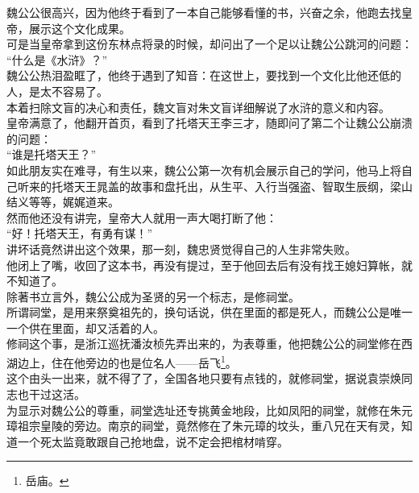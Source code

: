 \begin{multicols}{\theparacolNo}
魏公公很高兴，因为他终于看到了一本自己能够看懂的书，兴奋之余，他跑去找皇帝，展示这个文化成果。\\

可是当皇帝拿到这份东林点将录的时候，却问出了一个足以让魏公公跳河的问题：\\

“什么是《水浒》？”\\

魏公公热泪盈眶了，他终于遇到了知音：在这世上，要找到一个文化比他还低的人，是太不容易了。\\

本着扫除文盲的决心和责任，魏文盲对朱文盲详细解说了水浒的意义和内容。\\

皇帝满意了，他翻开首页，看到了托塔天王李三才，随即问了第二个让魏公公崩溃的问题：\\

“谁是托塔天王？”\\

如此朋友实在难寻，有生以来，魏公公第一次有机会展示自己的学问，他马上将自己听来的托塔天王晁盖的故事和盘托出，从生平、入行当强盗、智取生辰纲，梁山结义等等，娓娓道来。\\

然而他还没有讲完，皇帝大人就用一声大喝打断了他：\\

“好！托塔天王，有勇有谋！”\\

讲坏话竟然讲出这个效果，那一刻，魏忠贤觉得自己的人生非常失败。\\

他闭上了嘴，收回了这本书，再没有提过，至于他回去后有没有找王媳妇算帐，就不知道了。\\

除著书立言外，魏公公成为圣贤的另一个标志，是修祠堂。\\

所谓祠堂，是用来祭奠祖先的，换句话说，供在里面的都是死人，而魏公公是唯一一个供在里面，却又活着的人。\\

修祠这个事，是浙江巡抚潘汝桢先弄出来的，为表尊重，他把魏公公的祠堂修在西湖边上，住在他旁边的也是位名人——岳飞\footnote{岳庙。}。\\

这个由头一出来，就不得了了，全国各地只要有点钱的，就修祠堂，据说袁崇焕同志也干过这活。\\

为显示对魏公公的尊重，祠堂选址还专挑黄金地段，比如凤阳的祠堂，就修在朱元璋祖宗皇陵的旁边。南京的祠堂，竟然修在了朱元璋的坟头，重八兄在天有灵，知道一个死太监竟敢跟自己抢地盘，说不定会把棺材啃穿。\\


\end{multicols}
